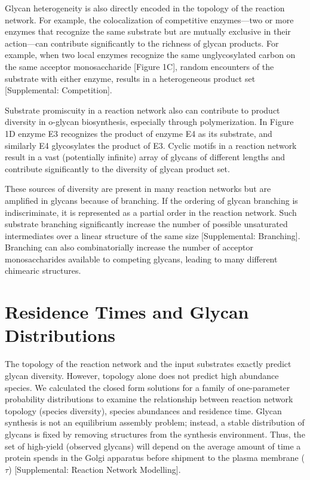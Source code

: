 \documentclass[twocolumn]{article}
\begin{document}
Glycan heterogeneity is also directly encoded in the topology of the reaction network. For example, the colocalization of competitive enzymes---two or more enzymes that recognize the same substrate but are mutually exclusive in their action---can contribute significantly to the richness of glycan products. For example, when two local enzymes recognize the same unglycosylated carbon on the same acceptor monosaccharide [Figure 1C],  random encounters of the substrate with either enzyme, results in a heterogeneous product set [Supplemental: Competition].

Substrate promiscuity in a reaction network also can contribute to product diversity in o-glycan biosynthesis, especially through polymerization. In Figure 1D enzyme E3 recognizes the product of enzyme E4 as its substrate, and similarly E4 glycosylates the product of E3. Cyclic motifs in a reaction network result in a vast (potentially infinite) array of glycans of different lengths and contribute significantly to the diversity of glycan product set. 

These sources of diversity are present in many reaction networks but are amplified in glycans because of branching. If the ordering of glycan branching is indiscriminate, it is represented as a partial order in the reaction network. Such substrate branching significantly increase the number of possible unsaturated intermediates over a linear structure of the same size [Supplemental: Branching]. Branching can also combinatorially increase the number of acceptor monosaccharides available to competing glycans, leading to many different chimearic structures.\\ 


\section*{Residence Times and Glycan Distributions}
The topology of the reaction network and the input substrates exactly predict glycan diversity. However, topology alone does not predict high abundance species. We calculated the closed form solutions for a family of one-parameter probability distributions to examine the relationship between reaction network topology (species diversity), species abundances and residence time. Glycan synthesis is not an equilibrium assembly problem; instead, a stable distribution of glycans is fixed by removing structures from the synthesis environment. Thus, the set of high-yield (observed glycans) will depend on the average amount of time a protein spends in the Golgi apparatus before shipment to the plasma membrane ($\tau$) [Supplemental: Reaction Network Modelling].
\end{document}
